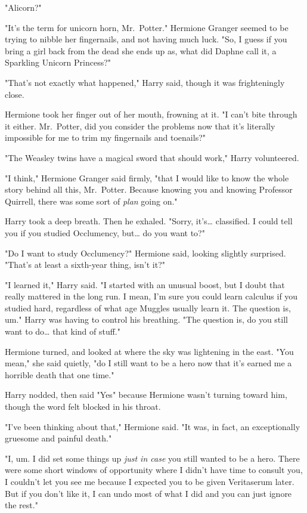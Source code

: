 "Alicorn?"

"It's the term for unicorn horn, Mr.~Potter." Hermione Granger seemed to be
trying to nibble her fingernails, and not having much luck. "So, I guess if you
bring a girl back from the dead she ends up as, what did Daphne call it, a
Sparkling Unicorn Princess?"

"That's not exactly what happened," Harry said, though it was frighteningly
close.

Hermione took her finger out of her mouth, frowning at it. "I can't bite
through it either. Mr.~Potter, did you consider the problems now that it's
literally impossible for me to trim my fingernails and toenails?"

"The Weasley twins have a magical sword that should work," Harry volunteered.

"I think," Hermione Granger said firmly, "that I would like to know the whole
story behind all this, Mr.~Potter. Because knowing you and knowing Professor
Quirrell, there was some sort of \emph{plan} going on."

Harry took a deep breath. Then he exhaled. "Sorry, it's{\ldots} classified. I
could tell you if you studied Occlumency, but{\ldots} do you want to?"

"Do I want to study Occlumency?" Hermione said, looking slightly surprised.
"That's at least a sixth-year thing, isn't it?"

"I learned it," Harry said. "I started with an unusual boost, but I doubt that
really mattered in the long run. I mean, I'm sure you could learn calculus if
you studied hard, regardless of what age Muggles usually learn it. The question
is, um." Harry was having to control his breathing. "The question is, do you
still want to do{\ldots} that kind of stuff."

Hermione turned, and looked at where the sky was lightening in the east. "You
mean," she said quietly, "do I still want to be a hero now that it's earned me
a horrible death that one time."

Harry nodded, then said "Yes" because Hermione wasn't turning toward him,
though the word felt blocked in his throat.

"I've been thinking about that," Hermione said. "It was, in fact, an
exceptionally gruesome and painful death."

"I, um. I did set some things up \emph{just in case} you still wanted to be a
hero. There were some short windows of opportunity where I didn't have time to
consult you, I couldn't let you see me because I expected you to be given
Veritaserum later. But if you don't like it, I can undo most of what I did and
you can just ignore the rest."

